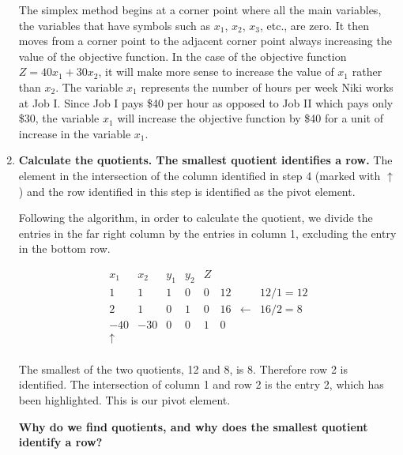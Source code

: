 \begin{solution}
\begin{enumerate}
              The simplex method begins at a corner point where all the main variables, the variables that have symbols such as $x_1$, $x_2$, $x_3$, etc., are zero. It then moves from a corner point to the adjacent corner point always increasing the value of the objective function. In the case of the objective function $Z = 40x_1 + 30x_2$, it will make more sense to increase the value of $x_1$ rather than $x_2$. The variable $x_1$ represents the number of hours per week Niki works at Job I. Since Job I pays \$40 per hour as opposed to Job II which pays only \$30, the variable $x_1$ will increase the objective function by \$40 for a unit of increase in the variable $x_1$.

        \item \textbf{ Calculate the quotients. The smallest quotient identifies a row.}
              The element in the intersection of the column identified in step 4 (marked with $\uparrow$) and the row identified in this step is identified as the pivot element.

              Following the algorithm, in order to calculate the quotient, we divide the entries in the far right column by the entries in column 1, excluding the entry in the bottom row.

              \[
                  \begin{array}{ccccc|ccc}

                      x_1      & x_2 & y_1 & y_2 & Z &    &            &           \\

                      1        & 1   & 1   & 0   & 0 & 12 &            & 12/1 = 12 \\
                      2        & 1   & 0   & 1   & 0 & 16 & \leftarrow & 16/2 = 8  \\
                      \hline
                      -40      & -30 & 0   & 0   & 1 & 0  &            &           \\
                      \uparrow &     &     &     &   &    &            &           \\
                  \end{array}
              \]

              The smallest of the two quotients, 12 and 8, is 8. Therefore row 2 is identified. The intersection of column 1 and row 2 is the entry 2, which has been highlighted. This is our pivot element.

              \textbf{Why do we find quotients, and why does the smallest quotient identify a row?}


\end{enumerate}
\end{solution}

